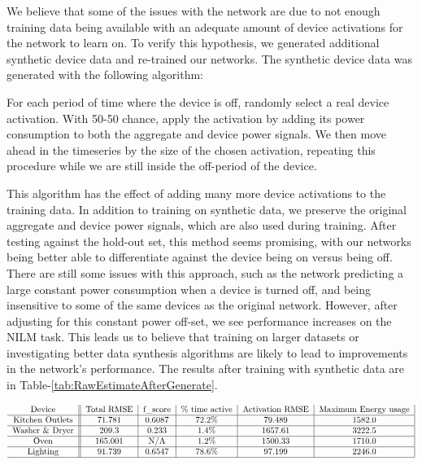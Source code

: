 \documentclass{article}
\begin{document}
We believe that some of the issues with the network are due to not enough training data being available with an adequate amount of device activations for the network to learn on.
To verify this hypothesis, we generated additional synthetic device data and re-trained our networks.
The synthetic device data was generated with the following algorithm:

For each period of time where the device is off, randomly select a real device activation.
With 50-50 chance, apply the activation by adding its power consumption to both the aggregate and device power signals.
We then move ahead in the timeseries by the size of the chosen activation, repeating this procedure while we are still inside the off-period of the device.

This algorithm has the effect of adding many more device activations to the training data.
In addition to training on synthetic data, we preserve the original aggregate and device power signals, which are also used during training.
After testing against the hold-out set, this method seems promising, with our networks being better able to differentiate against the device being on versus being off.
There are still some issues with this approach, such as the network predicting a large constant power consumption when a device is turned off, and being insensitive to some of the same devices as the original network.
However, after adjusting for this constant power off-set, we see performance increases on the NILM task.
This leads us to believe that training on larger datasets or investigating better data synthesis algorithms are likely to lead to improvements in the network's performance.
The results after training with synthetic data are in Table-\ref{tab:RawEstimateAfterGenerate}.

\begin{table*}[t]
	\centering
	$$\begin{tabular}{c||c|c|c|c|c|}
	Device & Total RMSE & f\_score & \% time active& Activation RMSE & Maximum Energy usage \\
	\hline
	Kitchen Outlets & 71.781 & 0.6087 & 72.2\% & 79.489  & 1582.0  \\ %
	\hline
	Washer \& Dryer  & 209.3 & 0.233 & 1.4\% & 1657.61  & 3222.5 \\ %
	\hline
	Oven & 165.001 & N/A & 1.2\% & 1500.33  & 1710.0  \\ %
	\hline
	Lighting & 91.739 & 0.6547 & 78.6\% & 97.199  & 2246.0  \\ %
	\hline
	\end{tabular}$$
	
	 \label{tab:RawEstimate} 
\end{table*}
\end{document}
